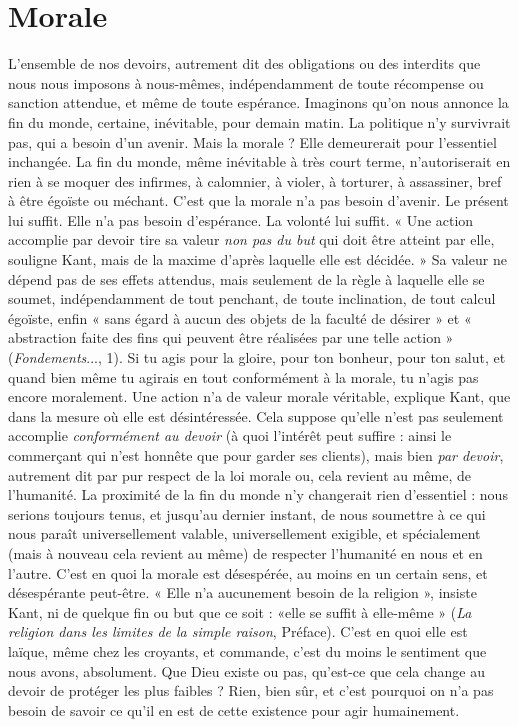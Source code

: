 \section{Morale}
L'ensemble de nos devoirs, autrement dit des obligations ou des
interdits que nous nous imposons à nous-mêmes, indépendamment
de toute récompense ou sanction attendue, et même de toute espérance.
Imaginons qu’on nous annonce la fin du monde, certaine, inévitable, pour
demain matin. La politique n’y survivrait pas, qui a besoin d’un avenir. Mais la
morale ? Elle demeurerait pour l'essentiel inchangée. La fin du monde, même
inévitable à très court terme, n’autoriserait en rien à se moquer des infirmes, à
calomnier, à violer, à torturer, à assassiner, bref à être égoïste ou méchant. C’est
que la morale n’a pas besoin d’avenir. Le présent lui suffit. Elle n’a pas besoin
d'espérance. La volonté lui suffit. « Une action accomplie par devoir tire sa
valeur {\it non pas du but} qui doit être atteint par elle, souligne Kant, mais de la
maxime d’après laquelle elle est décidée. » Sa valeur ne dépend pas de ses effets
attendus, mais seulement de la règle à laquelle elle se soumet, indépendamment
de tout penchant, de toute inclination, de tout calcul égoïste, enfin « sans égard
à aucun des objets de la faculté de désirer » et « abstraction faite des fins qui
peuvent être réalisées par une telle action » ({\it Fondements}..., 1). Si tu agis pour la
gloire, pour ton bonheur, pour ton salut, et quand bien même tu agirais en
tout conformément à la morale, tu n’agis pas encore moralement. Une action
n’a de valeur morale véritable, explique Kant, que dans la mesure où elle est
désintéressée. Cela suppose qu’elle n’est pas seulement accomplie {\it conformément
au devoir} (à quoi l'intérêt peut suffire : ainsi le commerçant qui n’est honnête
que pour garder ses clients), mais bien {\it par devoir}, autrement dit par pur respect
de la loi morale ou, cela revient au même, de l’humanité. La proximité de la fin
du monde n’y changerait rien d’essentiel : nous serions toujours tenus, et
jusqu’au dernier instant, de nous soumettre à ce qui nous paraît universellement
valable, universellement exigible, et spécialement (mais à nouveau cela
revient au même) de respecter l'humanité en nous et en l’autre. C’est en quoi
la morale est désespérée, au moins en un certain sens, et désespérante peut-être.
« Elle n’a aucunement besoin de la religion », insiste Kant, ni de quelque fin ou
but que ce soit : «elle se suffit à elle-même » ({\it La religion dans les limites de la
simple raison}, Préface). C’est en quoi elle est laïque, même chez les croyants, et
commande, c'est du moins le sentiment que nous avons, absolument. Que
Dieu existe ou pas, qu'est-ce que cela change au devoir de protéger les plus
faibles ? Rien, bien sûr, et c’est pourquoi on n’a pas besoin de savoir ce qu’il en
est de cette existence pour agir humainement.

